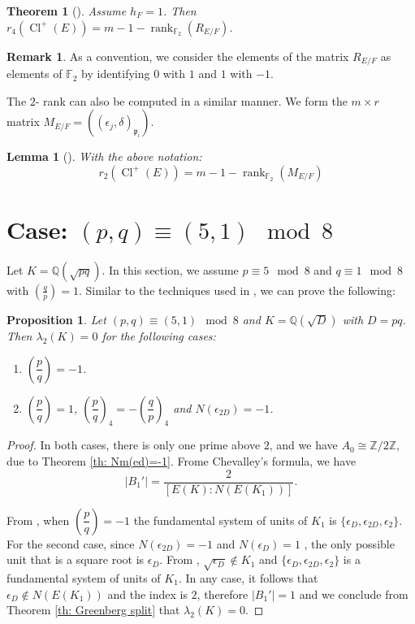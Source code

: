 \documentclass{article}
\numberwithin{equation}{section}
\theoremstyle{plain}  %
\newtheorem{theorem}{Theorem}[section]
\newtheorem{lemma}{Lemma}[section]
\newtheorem{proposition}{Proposition}[section]
\theoremstyle{definition}
\newtheorem{remark}{Remark}[section]
\newcommand{\Z}{\mathbb{Z}}
\newcommand{\Q}{\mathbb{Q}}
\newcommand{\F}{\mathbb{F}}
\newcommand{\kron}[2]{\left( \tfrac{#1}{#2} \right)}
\newcommand{\e}{\epsilon}
\DeclareMathOperator{\rank}{rank}
\DeclareMathOperator{\Cl}{Cl}
\newcommand{\fk}{\mathfrak }
\begin{document}
\begin{theorem}[{\cite[Theorem~2.1]{MR2452635}}] \label{th: generalized Redei}
    Assume $h_F=1$. Then $r_4(\Cl^+(E))=m-1- \rank_{\F_2}(R_{E/F})$.
\end{theorem}

\begin{remark}
    As a convention, we consider the elements of the matrix $R_{E/F}$ as elements of $\F_2$ by identifying $0$ with $1$ and $1$ with $-1$.
\end{remark}

The $2$- rank can also be computed in a similar manner. We form the $m\times r$ matrix 
$M_{E/F}=((\e_j,\delta)_{\fk p_i})$. 
\begin{lemma}[{\cite[Lemma~2.4]{MR2452635}}]
With the above notation: 
$$r_2(\Cl^+(E))=m-1-\rank_{\F_2}(M_{E/F})$$
\end{lemma}

\section{Case: \texorpdfstring{$(p,q)\equiv (5,1)\mod 8$}{(p,q)=1 mod 8}}
Let $K=\Q(\sqrt{pq})$. In this section, we assume $p\equiv 5 \mod 8$ and $q\equiv 1 \mod 8$ with $\kron{q}{p}=1$. Similar to the techniques used in \cite{MR4879114}, we can prove the following:

\begin{proposition} \label{th: case (5,1)}
    Let $(p,q) \equiv (5,1)\mod 8$ and $K=\mathbb{Q}(\sqrt{D})$ with $D=pq$. Then $\lambda_2(K)=0$ for the following cases:
    \begin{enumerate}
        \item $\left( \dfrac{p}{q} \right)=-1$.   
\smallskip
\item  $\left( \dfrac{p}{q} \right)=1$, $\left( \dfrac{p}{q} \right)_{4}=-\left( \dfrac{q}{p} \right)_{4}$ and $N(\epsilon_{2D})=-1$.
    \end{enumerate}
\end{proposition}

\begin{proof}
    In both cases, there is only one prime above $2$, and we have $A_{0} \cong \Z/ 2\Z$, due to Theorem \ref{th: Nm(ed)=-1}. Frome Chevalley's formula, we have 
    $$| B_1'| =\frac{2}{[E(K):N (E(K_1))]}.$$

    From \cite{MR4879114}, when $ \left( \dfrac{p}{q} \right) =-1$ the fundamental system of units of $K_1$ is $\{ \epsilon_D, \epsilon_{2D}, \epsilon_2 \}$. For the second case, since $N(\epsilon_{2D})=-1$ and $N(\epsilon_D)=1$ , the only possible unit that is a square root is $\epsilon_D$. From \cite[Lemma~3.3.8]{MR4879114}, $\sqrt{\epsilon_D} \not \in K_1$ and $\{ \epsilon_D, \epsilon_{2D}, \epsilon_2 \}$ is a fundamental system of units of $K_1$. In any case, it follows that $\epsilon_D \not \in N(E(K_1))$ and the index is $2$, therefore $|B_1'|=1$ and we conclude from Theorem \ref{th: Greenberg split} that $\lambda_2(K) = 0$.
    
\end{proof}
\end{document}
